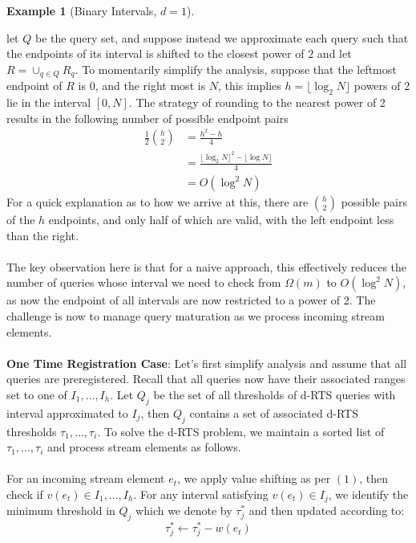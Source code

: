 \documentclass{article}
\newtheorem{example}{Example}
\begin{document}
\begin{example}[Binary Intervals, $d=1$] 
\end{example}
let $Q$ be the query set, and suppose instead we approximate each query such that the endpoints of its interval is shifted to the closest power of $2$ and let $R = \cup_{q\in Q}R_q$. To momentarily simplify the analysis, suppose that the leftmost endpoint of $R$ is 0, and the right most is $N$, this implies $h = \lfloor \log_2 N \rfloor$ powers of 2 lie in the interval $[0,N]$. The strategy of rounding to the nearest power of 2 results in the following number of possible endpoint pairs
\begin{align*}
    \frac{1}{2} {h\choose 2} &= \frac{h^2-h}{4} \\
    &= \frac{\lfloor\log_2 N\rfloor^2 - \lfloor\log N\rfloor}{4} \\
    &= O(\log^2 N)
\end{align*}
For a quick explanation as to how we arrive at this, there are ${h\choose2}$ possible pairs of the $h$ endpoints, and only half of which are valid, with the left endpoint less than the right. \\
\\
The key observation here is that for a naive approach, this effectively reduces the number of queries whose interval we need to check from $\Omega(m)$ to $O(\log^2 N)$, as now the endpoint of all intervals are now restricted to a power of 2. The challenge is now to manage query maturation as we process incoming stream elements. \\
\\
\textbf{One Time Registration Case}: Let's first simplify analysis and assume that all queries are preregistered. Recall that all queries now have their associated ranges set to one of $I_1, \dots, I_h$. Let $Q_j$ be the set of all thresholds of d-RTS queries with interval approximated to $I_j$, then $Q_j$ contains a set of associated d-RTS thresholds $\tau_1,\dots, \tau_i$. To solve the d-RTS problem, we maintain a sorted list of $\tau_1,\dots,\tau_i$ and process stream elements as follows.  \\
\\
For an incoming stream element $e_t$, we apply value shifting as per $(1)$, then check if $v(e_t) \in I_1, \dots, I_h$. For any interval satisfying $v(e_t)\in  I_j$, we identify the minimum threshold in $Q_j$ which we denote by $\tau_j^*$ and then updated according to: 
\begin{equation}
    \tau_j^* \leftarrow \tau_j^* - w(e_t)
\end{equation}
\end{document}

